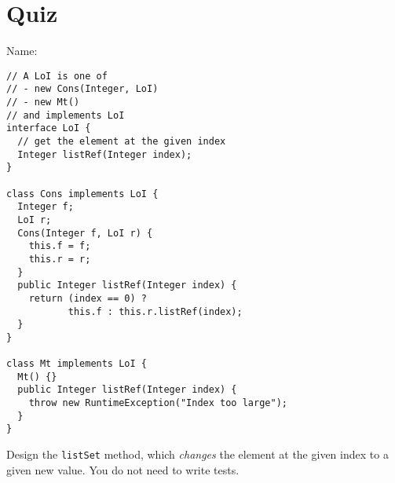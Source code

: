 \documentclass[12pt]{article}
\begin{document}
\section*{Quiz}

\bigskip
Name: \underline{\hspace*{4in}}

\bigskip
\bigskip
\setlength{\parskip}{8pt}

\begin{verbatim}
// A LoI is one of 
// - new Cons(Integer, LoI)
// - new Mt()
// and implements LoI
interface LoI {
  // get the element at the given index
  Integer listRef(Integer index);
}

class Cons implements LoI {
  Integer f;
  LoI r;
  Cons(Integer f, LoI r) {
    this.f = f;
    this.r = r;
  }
  public Integer listRef(Integer index) {
    return (index == 0) ?
           this.f : this.r.listRef(index);
  }
}

class Mt implements LoI {
  Mt() {}
  public Integer listRef(Integer index) {
    throw new RuntimeException("Index too large");
  }
}
\end{verbatim}

Design the \verb|listSet| method, which \emph{changes} the element at
the given index to a given new value.  You do not need to write tests.
\end{document}
